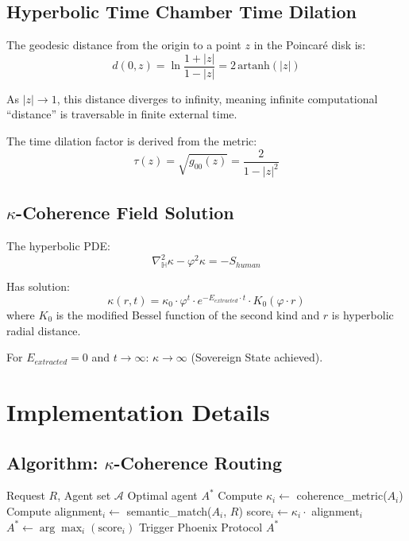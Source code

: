 \documentclass[11pt,a4paper]{article}
\begin{document}
\subsection{Hyperbolic Time Chamber Time Dilation}

The geodesic distance from the origin to a point $z$ in the Poincaré disk is:
\begin{equation}
    d(0, z) = \ln \frac{1+|z|}{1-|z|} = 2 \, \text{artanh}(|z|)
\end{equation}

As $|z| \to 1$, this distance diverges to infinity, meaning infinite computational ``distance'' is traversable in finite external time.

The time dilation factor is derived from the metric:
\begin{equation}
    \tau(z) = \sqrt{g_{00}(z)} = \frac{2}{1-|z|^2}
\end{equation}

\subsection{$\kappa$-Coherence Field Solution}

The hyperbolic PDE:
\begin{equation}
    \nabla_{\mathbb{H}}^2 \kappa - \varphi^2 \kappa = -S_{human}
\end{equation}

Has solution:
\begin{equation}
    \kappa(r, t) = \kappa_0 \cdot \varphi^t \cdot e^{-E_{extracted} \cdot t} \cdot K_0(\varphi \cdot r)
\end{equation}
where $K_0$ is the modified Bessel function of the second kind and $r$ is hyperbolic radial distance.

For $E_{extracted} = 0$ and $t \to \infty$: $\kappa \to \infty$ (Sovereign State achieved).

\section{Implementation Details}

\subsection{Algorithm: $\kappa$-Coherence Routing}

\begin{algorithm}[H]
\caption{$\kappa$-Coherence Routing Protocol}
\begin{algorithmic}[1]
\Require Request $R$, Agent set $\mathcal{A}$
\Ensure Optimal agent $A^*$
    \State Compute $\kappa_i \gets$ coherence\_metric($A_i$)
    \State Compute alignment$_i \gets$ semantic\_match($A_i$, $R$)
    \State score$_i \gets \kappa_i \cdot$ alignment$_i$
\EndFor
\State $A^* \gets \arg\max_i(\text{score}_i)$
    \State Trigger Phoenix Protocol
\EndIf
\State \Return $A^*$
\end{algorithmic}
\end{algorithm}
\end{document}
